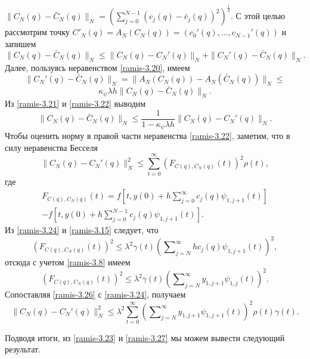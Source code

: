 $\|C_N(q)-\bar C_N(q)\|_N= \left(\sum_{j=0}^{N-1}(c_j(q)-\bar c_j(q))^2\right)^\frac12$. С этой целью рассмотрим точку $C'_N(q)=A_N(C_N(q))=(c_0'(q),\ldots,c_{N-1}'(q))$ и запишем
\begin{equation}\label{ramis-3.21}
\|C_N(q)-\bar C_N(q)\|_N\le \|C_N(q)- C_N'(q)\|_N+\|C_N'(q)-\bar C_N(q)\|_N.
\end{equation}
Далее, пользуясь неравенством \eqref{ramis-3.20}, имеем
$$
\|C_N'(q)-\bar C_N(q)\|_N=\|A_N(C_N(q))-A_N(\bar C_N(q))\|_N\le
$$
\begin{equation}\label{ramis-3.22}
\kappa_\psi\lambda h\|C_N(q)-\bar C_N(q)\|_N.
\end{equation}
Из \eqref{ramis-3.21} и \eqref{ramis-3.22} выводим
\begin{equation}\label{ramis-3.23}
\|C_N(q)-\bar C_N(q)\|_N\le \frac1{1-\kappa_\psi\lambda h}\|C_N(q)- C_N'(q)\|_N.
\end{equation}
Чтобы оценить норму в правой части неравенства \eqref{ramis-3.22}, заметим, что в силу неравенства Бесселя
\begin{equation}\label{ramis-3.24}
\|C_N(q)- C_N'(q)\|_N^2\le \sum_{t=0}^{\infty} (F_{C(q),C_N(q)}(t))^2\rho(t),
\end{equation}
где
\begin{multline}\label{ramis-3.25}
 F_{C(q),C_N(q)}(t)=f\left[t,y(0)+ h\sum\nolimits_{j=0}^\infty c_j(q)\psi_{1,j+1}(t)\right] \\
  -f\left[t,y(0)+ h\sum\nolimits_{j=0}^{N-1}c_j(q)\psi_{1,j+1}(t)\right].
\end{multline}
Из \eqref{ramis-3.24} и \eqref{ramis-3.15} следует, что
$$
(F_{C(q),C_N(q)}(t))^2\le \lambda^2 \gamma(t)\left(\sum\nolimits_{j=N}^\infty hc_j(q)\psi_{1,j+1}(t)\right)^2,
$$
отсюда с учетом \eqref{ramis-3.8} имеем
\begin{equation}\label{ramis-3.26}
(F_{C(q),C_N(q)}(t))^2\le \lambda^2 \gamma(t)  \left(\sum\nolimits_{j=N}^\infty  y_{1,j+1}\psi_{1,j}(t)\right)^2.
\end{equation}
Сопоставляя \eqref{ramis-3.26} с \eqref{ramis-3.24}, получаем
\begin{equation}\label{ramis-3.27}
\|C_N(q)- C_N'(q)\|_N^2\le \lambda^2\sum_{t=0}^\infty\left(\sum\nolimits_{j=N}^\infty y_{1,j+1} \psi_{1,j+1}(t)\right)^2\rho(t)\gamma(t).
\end{equation}

Подводя итоги, из \eqref{ramis-3.23} и \eqref{ramis-3.27}  мы можем вывести следующий результат.


